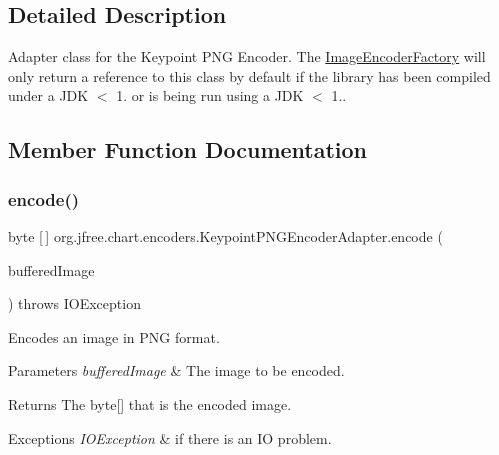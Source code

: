\subsection{Detailed Description}
Adapter class for the Keypoint P\+NG Encoder. The \mbox{\hyperlink{classorg_1_1jfree_1_1chart_1_1encoders_1_1_image_encoder_factory}{Image\+Encoder\+Factory}} will only return a reference to this class by default if the library has been compiled under a J\+DK $<$ 1. or is being run using a J\+DK $<$ 1.. 

\subsection{Member Function Documentation}
\mbox{\label{classorg_1_1jfree_1_1chart_1_1encoders_1_1_keypoint_p_n_g_encoder_adapter_addd4646d4405db17c71f6ab02265705f}} 
\subsubsection{\texorpdfstring{encode()}{encode()}\hspace{0.1cm}{\footnotesize\ttfamily [1/2]}}
{\footnotesize\ttfamily byte \mbox{[}$\,$\mbox{]} org.\+jfree.\+chart.\+encoders.\+Keypoint\+P\+N\+G\+Encoder\+Adapter.\+encode (\begin{DoxyParamCaption}\item[{Buffered\+Image}]{buffered\+Image }\end{DoxyParamCaption}) throws I\+O\+Exception}

Encodes an image in P\+NG format.


\begin{DoxyParams}{Parameters}
{\em buffered\+Image} & The image to be encoded. \\
\hline
\end{DoxyParams}
\begin{DoxyReturn}{Returns}
The byte\mbox{[}\mbox{]} that is the encoded image. 
\end{DoxyReturn}

\begin{DoxyExceptions}{Exceptions}
{\em I\+O\+Exception} & if there is an IO problem. \\
\hline
\end{DoxyExceptions}


